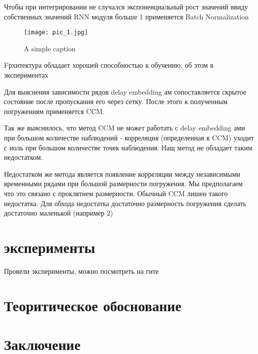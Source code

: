 \documentclass[12pt, twoside]{article}
\begin{document}
Чтобы при интегрировании не случался экспоненциальный рост значений ввиду собственных значений RNN модуля больше 1 применяется Batch Normalization


\begin{figure}[ht!]
	\centering
	\texttt{[image: pic\_1.jpg]}
	\caption{A simple caption \label{overflow}}
\end{figure}

Fрхитектура обладает хорошей способностью к обучению, об этом в экспериментах  

Для выяснения зависимости рядов delay embedding ам сопоставляется скрытое состояние после пропускания его через сетку. После этого к полученным погружениям применяется CCM.

Так же выяснилось, что метод CCM не может работать с delay embedding ами при большом количестве наблюдений - корреляция (определенная в CCM) уходит с ноль при большом количестве точек наблюдения. 
Нащ метод не обладает таким недостатком.

Недостатком же метода является появление корреляции между независимыми временными рядами при большой размерности погружения. Мы предполагаем что это связано с проклятием размерности. 
Обычный CCM лишен такого недостатка. Для обхода недостатка достаточно размерность погружения сделать достаточно маленькой (например 2)



\section{эксперименты}
	Провели эксперименты, можно посмотреть на гите
	
\section{Теоритическое обоснование}
	
\section{Заключение}




\newpage
\end{document}
